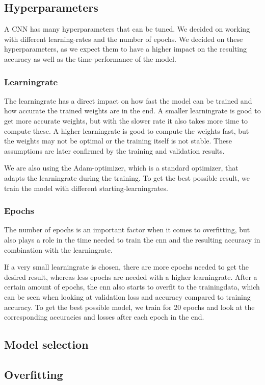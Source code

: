 \documentclass[12pt,a4paper]{scrartcl}		%
\begin{document}
    \subsection{Hyperparameters}
        A CNN has many hyperparameters that can be tuned. We decided on working with different learning-rates and the number of epochs. We decided 
        on these hyperparameters, as we expect them to have a higher impact on the resulting accuracy as well as the time-performance of the model.
        \subsubsection{Learningrate}
        The learningrate has a direct impact on how fast the model can be trained and how accurate the trained weights are in the end.
        A smaller learningrate is good to get more accurate weights, but with the slower rate it also takes more time to compute these.
        A higher learningrate is good to compute the weights fast, but the weights may not be optimal or the training itself is not stable.
        These assumptions are later confirmed by the training and validation results.

        We are also using the Adam-optimizer, which is a standard optimizer, that adapts the learningrate during the training. To get the best possible 
        result, we train the model with different starting-learningrates.
        \subsubsection{Epochs}
        The number of epochs is an important factor when it comes to overfitting, but also plays a role in the time needed to train the cnn and the 
        resulting accuracy in combination with the learningrate.

        If a very small learningrate is chosen, there are more epochs needed to get the desired result, whereas less epochs are needed with 
        a higher learningrate.
        After a certain amount of epochs, the cnn also starts to overfit to the trainingdata, which can be seen when looking at validation loss and accuracy 
        compared to training accuracy.
        To get the best possible model, we train for 20 epochs and look at the corresponding accuracies and losses after each epoch in the end.

    \subsection{Model selection}
    \subsection{Overfitting}


\begin{lstlisting}[language=Python]
\end{lstlisting}
\end{document}

